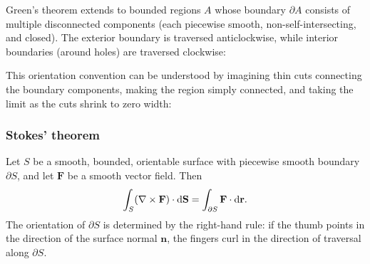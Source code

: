 \documentclass[a4paper]{article}
\begin{document}
\begin{rmk}
  Green's theorem extends to bounded regions $A$ whose boundary $\partial A$ consists of multiple disconnected components (each piecewise smooth, non-self-intersecting, and closed). The exterior boundary is traversed anticlockwise, while interior boundaries (around holes) are traversed clockwise:
  \begin{center}
  \end{center}
  This orientation convention can be understood by imagining thin cuts connecting the boundary components, making the region simply connected, and taking the limit as the cuts shrink to zero width:
  \begin{center}
  \end{center}
\end{rmk}

\subsubsection{Stokes' theorem}
\begin{thm}
  Let $S$ be a smooth, bounded, orientable surface with piecewise smooth boundary $\partial S$, and let $\mathbf{F}$ be a smooth vector field. Then
  \[
    \int_S (\nabla\times \mathbf{F})\cdot \mathrm{d} \mathbf{S} = \int_{\partial S} \mathbf{F}\cdot \mathrm{d} \mathbf{r}.
  \]
  The orientation of $\partial S$ is determined by the right-hand rule: if the thumb points in the direction of the surface normal $\mathbf{n}$, the fingers curl in the direction of traversal along $\partial S$.
\end{thm}
\end{document}
